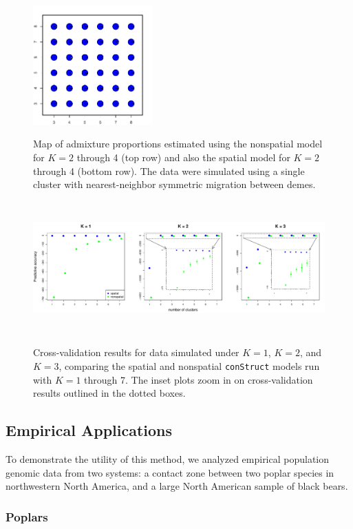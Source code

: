 \documentclass[12pt]{article}
\begin{document}
\begin{figure}
			{\includegraphics[width=1.8in,height=1.8in]{figs/sims/simK1_sp_pies_K7.pdf}}
	\caption{
	Map of admixture proportions estimated using the nonspatial model for $K=2$ through 4 (top row)
	and also the spatial model for $K=2$ through 4 (bottom row).
	The data were simulated using a single cluster with nearest-neighbor symmetric migration between demes.
    }\label{simK1_pies}
\end{figure}

\begin{figure}
	\centering
		{\includegraphics[width=6in,height=2in]{figs/sims/sim_xvals.pdf}}
	\caption{
	Cross-validation results for data simulated under $K=1$, $K=2$, and $K=3$, 
	comparing the spatial and nonspatial \texttt{conStruct} models run with $K=1$ through 7.  
	The inset plots zoom in on cross-validation results outlined in the dotted boxes.
    }\label{sim_xvals}
\end{figure}

\subsection*{Empirical Applications}
To demonstrate the utility of this method, we analyzed empirical population genomic data from two systems:
a contact zone between two poplar species in northwestern North America,
and a large North American sample of black bears.

\subsubsection*{Poplars}
\end{document}
